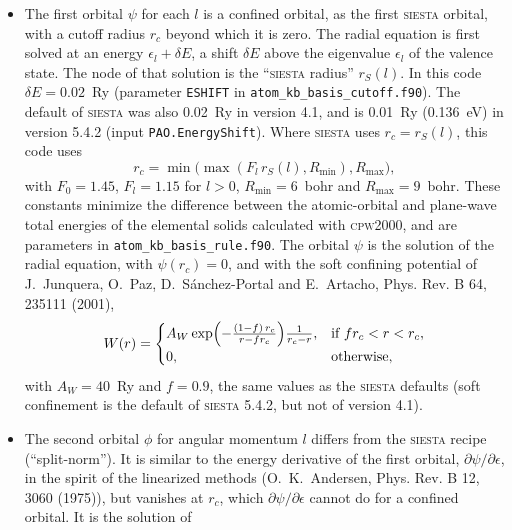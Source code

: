 \documentclass[11pt]{article}
\begin{document}
\begin{itemize}
  \item
    The first orbital $\psi$ for each $l$ is a confined orbital, as the first
    \textsc{siesta} orbital, with a cutoff radius $r_c$ beyond which it is zero.
    The radial equation is first solved at an energy $\epsilon_l + \delta E$, a shift $\delta E$
    above the eigenvalue $\epsilon_l$ of the valence state.  The node of that solution is the
    ``\textsc{siesta} radius'' $r_S(l)$.
    In this code $\delta E=0.02$~Ry (parameter \texttt{ESHIFT} in \texttt{atom\_kb\_basis\_cutoff.f90}).
    The default of \textsc{siesta} was also 0.02~Ry in version 4.1, and is 0.01~Ry (0.136~eV) in
    version 5.4.2 (input \texttt{PAO.EnergyShift}).
    Where \textsc{siesta} uses $r_c = r_S(l)$, this code uses
    \begin{equation}
       r_c = \min\bigl(\max(F_l\, r_S(l), R_\text{min}), R_\text{max}\bigr),
    \end{equation}
    with $F_0 = 1.45$, $F_l = 1.15$ for $l > 0$, $R_\text{min} = 6$~bohr and $R_\text{max} = 9$~bohr.
    These constants minimize the difference between the atomic-orbital and plane-wave
    total energies of the elemental solids calculated with \textsc{cpw2000},
    and are parameters in \texttt{atom\_kb\_basis\_rule.f90}.
    The orbital $\psi$ is the solution of the radial equation, with $\psi(r_c) = 0$, and with the
    soft confining potential of J.~Junquera, O.~Paz, D.~S\'anchez-Portal and E.~Artacho,
    Phys. Rev. B 64, 235111 (2001),
    \begin{equation}
       W(r) = \begin{cases}
                A_W \exp\Bigl(-\frac{(1-f)\,r_c}{r - f r_c}\Bigr) \frac{1}{r_c-r}, & \text{if } f r_c < r < r_c, \\
                0, & \text{otherwise},
              \end{cases}
    \end{equation}
    with $A_W = 40$~Ry and $f = 0.9$, the same values as the \textsc{siesta} defaults
    (soft confinement is the default of \textsc{siesta} 5.4.2, but not of version 4.1).
  \item
    The second orbital $\phi$ for angular momentum $l$ differs from the
    \textsc{siesta} recipe (``split-norm'').  It is similar to the energy derivative of the
    first orbital, $\partial\psi/\partial\epsilon$, in the spirit of the linearized
    methods (O.~K.~Andersen, Phys. Rev. B 12, 3060 (1975)), but vanishes at $r_c$, which
    $\partial\psi/\partial\epsilon$ cannot do for a confined orbital.  It is the solution of

\end{itemize}
\end{document}
